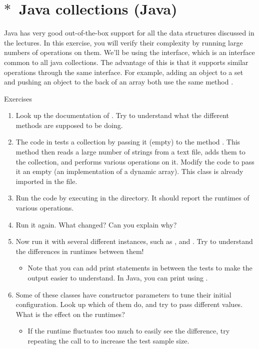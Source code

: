 \section{$\ast$~Java collections (Java)}

Java has very good out-of-the-box support for all the data structures discussed in the lectures. In this exercise, you will verify their complexity by running large numbers of operations on them. We'll be using the  interface, which is an interface common to all java collections. The advantage of this is that it supports similar operations through the same interface. For example, adding an object to a set and pushing an object to the back of an array both use the same method .
%
\begin{mybox}{Exercises}
    \begin{enumerate}
        \item Look up the documentation of . Try to understand what the different methods are supposed to be doing.
        \item The code in  tests a collection by passing it (empty) to the method . This method then reads a large number of strings from a text file, adds them to the collection, and performs various operations on it. Modify the code to pass it an empty  (an implementation of a dynamic array). This class is already imported in the file.
        \item Run the code by executing  in the  directory. It should report the runtimes of various operations.
        \item Run it again. What changed? Can you explain why?
        \item Now run it with several different  instances, such as ,  and . Try to understand the differences in runtimes between them!
            \begin{itemize}
                \item Note that you can add print statements in between the tests to make the output easier to understand. In Java, you can print using .
            \end{itemize}
        \item Some of these classes have constructor parameters to tune their initial configuration. Look up which of them do, and try to pass different values. What is the effect on the runtimes?
            \begin{itemize}
                \item If the runtime fluctuates too much to easily see the difference, try repeating the call to  to increase the test sample size.
            \end{itemize}
    \end{enumerate}
\end{mybox}


